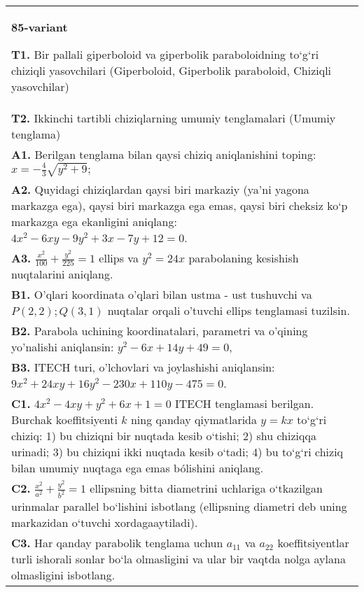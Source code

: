 \documentclass{article}
\begin{document}
\begin{tabular}{m{17cm}}
\textbf{85-variant}
\newline

\textbf{T1.} Bir pallali giperboloid va giperbolik paraboloidning to‘g‘ri chiziqli yasovchilari (Giperboloid, Giperbolik paraboloid, Chiziqli yasovchilar) \\
\textbf{T2.} Ikkinchi tartibli chiziqlarning umumiy tenglamalari (Umumiy tenglama) \\
\textbf{A1.} Berilgan tenglama bilan qaysi chiziq aniqlanishini toping: $x=-\frac{4}{3} \sqrt{y^2+9} ;$ \\
\textbf{A2.} Quyidagi chiziqlardan qaysi biri markaziy (ya’ni yagona markazga ega), qaysi biri markazga ega emas, qaysi biri cheksiz ko‘p markazga ega ekanligini aniqlang: $4 x^2-6 x y-9 y^2+3 x-7 y+12=0$. \\
\textbf{A3.} $\frac{x^2}{100}+\frac{y^2}{225}=1$ ellips va $y^2=24 x$ parabolaning kesishish nuqtalarini aniqlang. \\
\textbf{B1.} O'qlari koordinata o'qlari bilan ustma - ust tushuvchi va $P(2,2) ; Q(3,1)$ nuqtalar orqali o'tuvchi ellips tenglamasi tuzilsin. \\
\textbf{B2.} Parabola uchining koordinatalari, parametri va o'qining yo'nalishi aniqlansin: $y^2-6 x+14 y+49=0$, \\
\textbf{B3.} ITECH turi, o'lchovlari va joylashishi aniqlansin: $9 x^2+24 x y+16 y^2-230 x+110 y-475=0$. \\
\textbf{C1.} $4 x^2-4 x y+y^2+6 x+1=0$ ITECH tenglamasi berilgan. Burchak koeffitsiyenti $k$ ning qanday qiymatlarida $y=kx$ to‘g‘ri chiziq: 1) bu chiziqni bir nuqtada kesib o‘tishi; 2) shu chiziqqa urinadi; 3) bu chiziqni ikki nuqtada kesib o‘tadi; 4) bu to‘g‘ri chiziq bilan umumiy nuqtaga ega emas bólishini aniqlang. \\
\textbf{C2.} $\frac{x^2}{a^2}+\frac{y^2}{b^2}=1$ ellipsning bitta diametrini uchlariga o‘tkazilgan urinmalar parallel bo‘lishini isbotlang (ellipsning diametri deb uning markazidan o‘tuvchi xordagaaytiladi). \\
\textbf{C3.} Har qanday parabolik tenglama uchun $a_{11}$ va $a_{22}$ koeffitsiyentlar turli ishorali sonlar bo‘la olmasligini va ular bir vaqtda nolga aylana olmasligini isbotlang. \\

\end{tabular}
\vspace{1cm}
\end{document}
